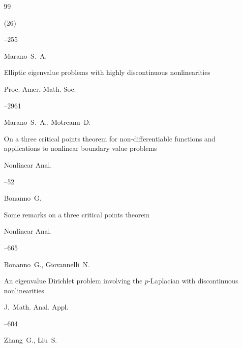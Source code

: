 \begin{thebibliography}{99}

(26)

--255






\by Marano~S.~A.

\paper Elliptic eigenvalue problems with highly discontinuous  nonlinearities

\jour Proc. Amer. Math. Soc.




--2961




\by Marano~S.~A., Motreanu~D.

\paper On a three critical points theorem for  non-differentiable functions and applications to nonlinear boundary value  problems

\jour Nonlinear Anal.




--52




\by Bonanno~G.

\paper Some remarks on a three critical points theorem

\jour Nonlinear Anal.




--665




\by Bonanno~G., Giovannelli~N.

\paper An eigenvalue Dirichlet problem involving  the $p$-Laplacian with discontinuous nonlinearities

\jour J.~Math. Anal. Appl.




--604




\by Zhang~G., Liu~S.


\end{thebibliography}
